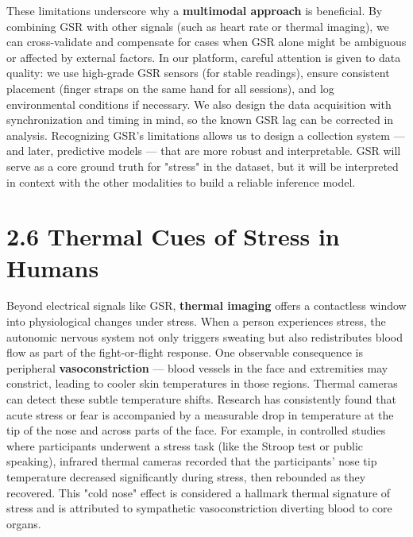 These limitations underscore why a \textbf{multimodal approach} is
beneficial. By combining GSR with other signals (such as heart rate or
thermal imaging), we can cross-validate and compensate for cases when
GSR alone might be ambiguous or affected by external factors. In our
platform, careful attention is given to data quality: we use high-grade
GSR sensors (for stable readings), ensure consistent placement (finger
straps on the same hand for all sessions), and log environmental
conditions if necessary. We also design the data acquisition with
synchronization and timing in mind, so the known GSR lag can be
corrected in analysis. Recognizing GSR's limitations allows us to design
a collection system --- and later, predictive models --- that are more
robust and interpretable. GSR will serve as a core ground truth for
"stress" in the dataset, but it will be interpreted in context with the
other modalities to build a reliable inference model.

\section{2.6 Thermal Cues of Stress in Humans}

Beyond electrical signals like GSR, \textbf{thermal imaging} offers a
contactless window into physiological changes under stress. When a
person experiences stress, the autonomic nervous system not only
triggers sweating but also redistributes blood flow as part of the
fight-or-flight response. One observable consequence is peripheral
\textbf{vasoconstriction} --- blood vessels in the face and extremities may
constrict, leading to cooler skin temperatures in those regions. Thermal
cameras can detect these subtle temperature shifts. Research has
consistently found that acute stress or fear is accompanied by a
measurable drop in temperature at the tip of the nose and across parts
of the
face\cite{ContactlessStressThermal2022}.
For example, in controlled studies where participants underwent a stress
task (like the Stroop test or public speaking), infrared thermal cameras
recorded that the participants' nose tip temperature decreased
significantly during stress, then rebounded as they
recovered\cite{ContactlessStressThermal2022}\cite{ContactlessStressThermal2022}.
This "cold nose" effect is considered a hallmark thermal signature of
stress and is attributed to sympathetic vasoconstriction diverting blood
to core organs.

